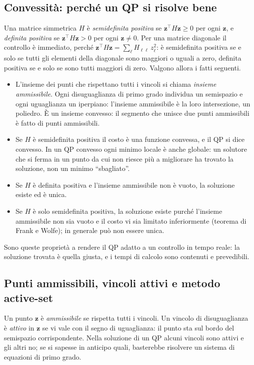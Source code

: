 \documentclass[11pt,a4paper]{article}
\newcommand{\vett}[1]{\boldsymbol{#1}}      %
\begin{document}
\subsection{Convessità: perché un QP si risolve bene}\label{sec:convessita}

Una matrice simmetrica $H$ è \emph{semidefinita positiva} se
$\vett{z}^\top H \vett{z} \ge 0$ per ogni $\vett{z}$, e \emph{definita positiva} se
$\vett{z}^\top H \vett{z} > 0$ per ogni $\vett{z} \ne 0$. Per una matrice diagonale il controllo è
immediato, perché $\vett{z}^\top H \vett{z} = \sum_\ell H_{\ell\ell}\, z_\ell^2$: è semidefinita positiva
se e solo se tutti gli elementi della diagonale sono maggiori o uguali a zero,
definita positiva se e solo se sono tutti maggiori di zero. Valgono allora i
fatti seguenti.
\begin{itemize}
  \item L'insieme dei punti che rispettano tutti i vincoli si chiama
        \emph{insieme ammissibile}. Ogni disuguaglianza di primo grado
        individua un semispazio e ogni uguaglianza un iperpiano: l'insieme
        ammissibile è la loro intersezione, un poliedro. È un insieme
        convesso: il segmento che unisce due punti ammissibili è fatto di
        punti ammissibili.
  \item Se $H$ è semidefinita positiva il costo è una funzione convessa, e il
        QP si dice convesso. In un QP convesso ogni minimo locale è anche
        globale: un solutore che si ferma in un punto da cui non riesce più a
        migliorare ha trovato la soluzione, non un minimo ``sbagliato''.
  \item Se $H$ è definita positiva e l'insieme ammissibile non è vuoto, la
        soluzione esiste ed è unica.
  \item Se $H$ è solo semidefinita positiva, la soluzione esiste purché
        l'insieme ammissibile non sia vuoto e il costo vi sia limitato
        inferiormente (teorema di Frank e Wolfe); in generale può non essere
        unica.
\end{itemize}
Sono queste proprietà a rendere il QP adatto a un controllo in tempo reale:
la soluzione trovata è quella giusta, e i tempi di calcolo sono contenuti e
prevedibili.

\subsection{Punti ammissibili, vincoli attivi e metodo active-set}\label{sec:attivi}

Un punto $\vett{z}$ è \emph{ammissibile} se rispetta tutti i vincoli. Un vincolo di
disuguaglianza è \emph{attivo} in $\vett{z}$ se vi vale con il segno di uguaglianza:
il punto sta sul bordo del semispazio corrispondente. Nella soluzione di un QP
alcuni vincoli sono attivi e gli altri no; se si sapesse in anticipo quali,
basterebbe risolvere un sistema di equazioni di primo grado.
\end{document}

